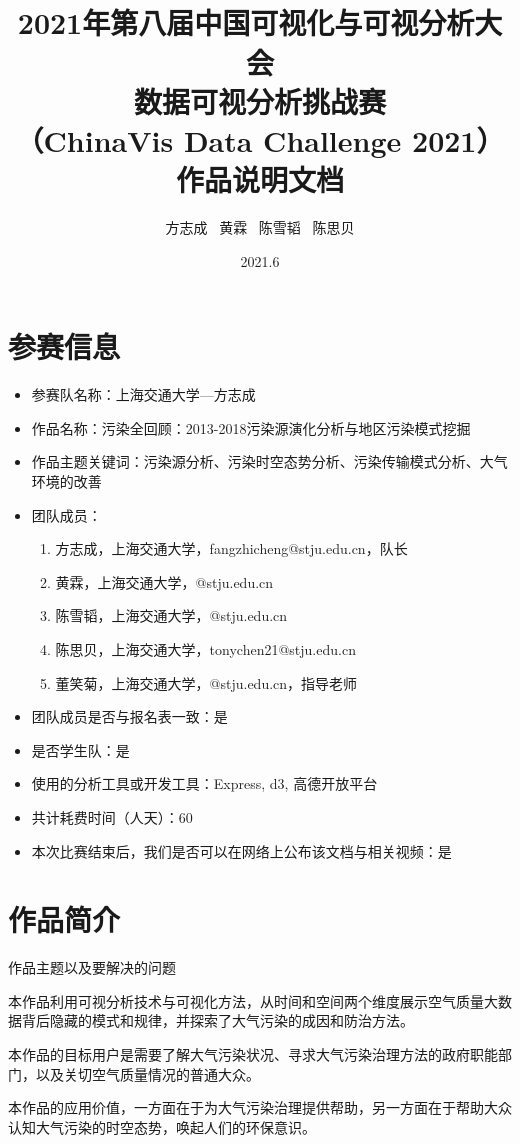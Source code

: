 \documentclass[UTF8]{ctexrep}
\title{
    \horrule{0.5pt} \\[0.4cm]
    \huge 2021年第八届中国可视化与可视分析大会\\
    数据可视分析挑战赛\\
    （ChinaVis Data Challenge 2021）\\
    作品说明文档\\
    \horrule{2pt}
}
\author{
    方志成 \ 黄霖 \ 陈雪韬 \ 陈思贝
}
\date{
    2021.6
}
\begin{document}
    \maketitle

    \section{参赛信息}

    \begin{itemize}
        \item 参赛队名称：上海交通大学—方志成
        \item 作品名称：污染全回顾：2013-2018污染源演化分析与地区污染模式挖掘
        \item 作品主题关键词：污染源分析、污染时空态势分析、污染传输模式分析、大气环境的改善
        \item 团队成员：
        \begin{enumerate}
            \item 方志成，上海交通大学，fangzhicheng@stju.edu.cn，队长
            \item 黄霖，上海交通大学，@stju.edu.cn
            \item 陈雪韬，上海交通大学，@stju.edu.cn
            \item 陈思贝，上海交通大学，tonychen21@stju.edu.cn
            \item 董笑菊，上海交通大学，@stju.edu.cn，指导老师
        \end{enumerate}
        \item 团队成员是否与报名表一致：是
        \item 是否学生队：是
        \item 使用的分析工具或开发工具：Express, d3, 高德开放平台
        \item 共计耗费时间（人天）：60
        \item 本次比赛结束后，我们是否可以在网络上公布该文档与相关视频：是
    \end{itemize}

    \section{作品简介}

    作品主题以及要解决的问题
    \par
    本作品利用可视分析技术与可视化方法，从时间和空间两个维度展示空气质量大数据背后隐藏的模式和规律，并探索了大气污染的成因和防治方法。
    \par
    本作品的目标用户是需要了解大气污染状况、寻求大气污染治理方法的政府职能部门，以及关切空气质量情况的普通大众。
    \par
    本作品的应用价值，一方面在于为大气污染治理提供帮助，另一方面在于帮助大众认知大气污染的时空态势，唤起人们的环保意识。
\end{document}
